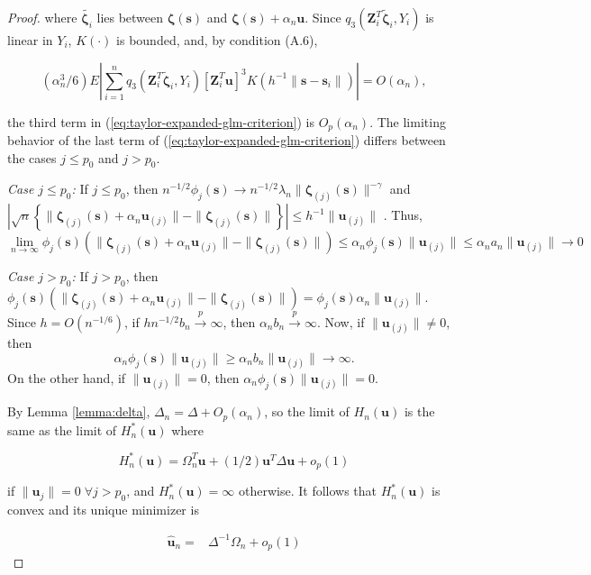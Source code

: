 \documentclass[authoryear,review, 12pt]{elsarticle}
\begin{document}
\begin{proof}
where $\tilde{\bm{\zeta}_{i}}$ lies between $\bm{\zeta}(\bm{s})$
and $\bm{\zeta}(\bm{s})+\alpha_{n}\bm{u}$. Since $q_{3}\left(\bm{Z}_{i}^{T}\tilde{\bm{\zeta}}_{i},Y_{i}\right)$
is linear in $Y_{i}$, $K\left(\cdot\right)$ is bounded, and, by
condition (A.6),

\[
\left(\alpha_{n}^{3}/6\right)E\left|\sum_{i=1}^{n}q_{3}\left(\bm{Z}_{i}^{T}\tilde{\bm{\zeta}}_{i},Y_{i}\right)\left[\bm{Z}_{i}^{T}\bm{u}\right]^{3}K\left(h^{-1}\|\bm{s}-\bm{s}_{i}\|\right)\right|=O\left(\alpha_{n}\right),
\]


the third term in (\ref{eq:taylor-expanded-glm-criterion}) is $O_{p}\left(\alpha_{n}\right)$.
The limiting behavior of the last term of (\ref{eq:taylor-expanded-glm-criterion})
differs between the cases $j\le p_{0}$ and $j>p_{0}$.

\emph{Case $j\le p_{0}$:} If $j\le p_{0}$, then $n^{-1/2}\phi_{j}(\bm{s})\to n^{-1/2}\lambda_{n}\|\bm{\zeta}_{(j)}(\bm{s})\|^{-\gamma}$
and $|\sqrt{n}\left\{ \|\bm{\zeta}_{(j)}(\bm{s})+\alpha_{n}\bm{u}_{(j)}\|-\|\bm{\zeta}_{(j)}(\bm{s})\|\right\} |\le h^{-1}\|\bm{u}_{(j)}\|$
. Thus, 
\[
\lim\limits _{n\to\infty}\phi_{j}(\bm{s})\left(\|\bm{\zeta}_{(j)}(\bm{s})+\alpha_{n}\bm{u}_{(j)}\|-\|\bm{\zeta}_{(j)}(\bm{s})\|\right)\le\alpha_{n}\phi_{j}(\bm{s})\|\bm{u}_{(j)}\|\le\alpha_{n}a_{n}\|\bm{u}_{(j)}\|\to0
\]


\emph{Case $j>p_{0}$:} If $j>p_{0}$, then $\phi_{j}(\bm{s})\left(\|\bm{\zeta}_{(j)}(\bm{s})+\alpha_{n}\bm{u}_{(j)}\|-\|\bm{\zeta}_{(j)}(\bm{s})\|\right)=\phi_{j}(\bm{s})\alpha_{n}\|\bm{u}_{(j)}\|$.
Since $h=O(n^{-1/6})$, if $hn^{-1/2}b_{n}\xrightarrow{p}\infty$,
then $\alpha_{n}b_{n}\xrightarrow{p}\infty$. Now, if $\|\bm{u}_{(j)}\|\ne0$,
then 
\[
\alpha_{n}\phi_{j}(\bm{s})\|\bm{u}_{(j)}\|\ge\alpha_{n}b_{n}\|\bm{u}_{(j)}\|\to\infty.
\]
On the other hand, if $\|\bm{u}_{(j)}\|=0$, then $\alpha_{n}\phi_{j}(\bm{s})\|\bm{u}_{(j)}\|=0$.

By Lemma \ref{lemma:delta}, $\Delta_{n}=\Delta+O_{p}\left(\alpha_{n}\right)$,
so the limit of $H_{n}(\bm{u})$ is the same as the limit of $H_{n}^{*}(\bm{u})$
where

\[
H_{n}^{*}(\bm{u})=\Omega_{n}^{T}\bm{u}+(1/2)\bm{u}^{T}\Delta\bm{u}+o_{p}\left(1\right)
\]
 

if $\|\bm{u}_{j}\|=0\;\forall j>p_{0}$, and $H_{n}^{*}(\bm{u})=\infty$
otherwise. It follows that $H_{n}^{*}(\bm{u})$ is convex and its
unique minimizer is

\begin{align*}
\hat{\bm{u}}_{n}= & \Delta^{-1}\Omega_{n}+o_{p}\left(1\right)
\end{align*}



\end{proof}
\end{document}
